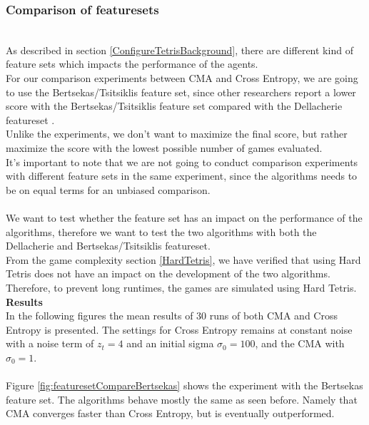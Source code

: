 \subsubsection{Comparison of featuresets  \label{compoffeatureset}}
\\
As described in section \ref{ConfigureTetrisBackground}, there are different kind of
feature sets which impacts the performance of the agents.\\
For our comparison experiments between CMA and Cross Entropy,
we are going to use the Bertsekas/Tsitsiklis feature set, since other researchers report
a lower score with the Bertsekas/Tsitsiklis feature set compared with the Dellacherie featureset \citep{thiery:09}.\\
Unlike the \citep{thiery:09} experiments, we don't want to maximize the
final score, but rather maximize the score with the lowest possible number of 
games evaluated.\\
It's important to note that we are not going to conduct comparison experiments with different
feature sets in the same experiment, since the algorithms needs to be on equal terms for an unbiased comparison.\\
\\
We want to test whether the feature set has an impact on the performance of the algorithms,
therefore we want to test the two algorithms with both the Dellacherie and Bertsekas/Tsitsiklis featureset.\\
From the game complexity section \ref{HardTetris}, we have verified that using Hard Tetris
\citep{boumaza2009} does not have an impact on the development of the two algorithms.
Therefore, to prevent long runtimes, the games are simulated
using Hard Tetris.\\

\textbf{Results}\\
In the following figures the mean results of 30 runs of both CMA and Cross 
Entropy is presented. The settings for Cross Entropy remains at constant noise
with a noise term of $z_t = 4$ and an initial sigma $\sigma_0 = 100$, 
and the CMA with $\sigma_0 = 1$.\\
\\
Figure \ref{fig:featuresetCompareBertsekas} shows the experiment with the 
Bertsekas feature set. The algorithms behave mostly the same as seen before.
Namely that CMA converges faster than Cross Entropy, 
but is eventually outperformed.

